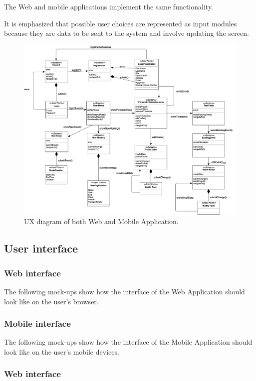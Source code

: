 \documentclass{article}
\begin{document}
 	\bigskip
	The Web and mobile applications implement the same functionality.
 	
 	\bigskip
	It is emphasized that possible user choices are represented as input modules because they are data to be sent to the system and involve updating the screen.

	\begin{figure}[!ht]
	\centering
	\includegraphics[width=\textwidth]{img/diagrams/ux.png}
	\caption{UX diagram of both Web and Mobile Application.}
	\end{figure}

	\subsection{User interface}
	\subsubsection{Web interface}
	The following mock-ups show how the interface of the Web Application should look like on the user’s browser.

	\subsubsection{Mobile interface}
	The following mock-ups show how the interface of the Mobile Application should look like on the user’s mobile devices.


	\subsubsection{Web interface}
\end{document}
